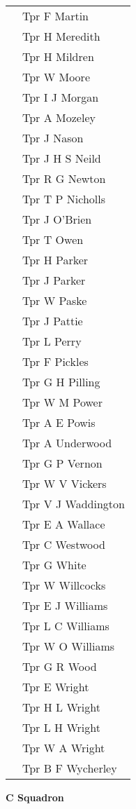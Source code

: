 \begin{center}
\begin{tabular}{rl}
    & Tpr F Martin \\
    & Tpr H Meredith \\
    & Tpr H Mildren \\
    & Tpr W Moore \\
    & Tpr I J Morgan \\
    & Tpr A Mozeley \\
    & Tpr J Nason \\
    & Tpr J H S Neild \\
    & Tpr R G Newton \\
    & Tpr T P Nicholls \\
    & Tpr J O'Brien \\
    & Tpr T Owen \\
    & Tpr H Parker \\
    & Tpr J Parker \\
    & Tpr W Paske \\
    & Tpr J Pattie \\
    & Tpr L Perry \\
    & Tpr F Pickles \\
    & Tpr G H Pilling \\
    & Tpr W M Power \\
    & Tpr A E Powis \\
    & Tpr A Underwood \\
    & Tpr G P Vernon \\
    & Tpr W V Vickers \\
    & Tpr V J Waddington \\
    & Tpr E A Wallace \\
    & Tpr C Westwood \\
    & Tpr G White \\
    & Tpr W Willcocks \\
    & Tpr E J Williams \\
    & Tpr L C Williams \\
    & Tpr W O Williams \\
    & Tpr G R Wood \\
    & Tpr E Wright \\
    & Tpr H L Wright \\
    & Tpr L H Wright \\
    & Tpr W A Wright \\
    & Tpr B F Wycherley \\
  \end{tabular}
\end{center}

\begin{center}
  \Large
  \textbf{C Squadron}
\end{center}

